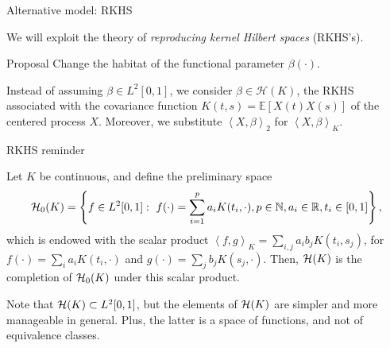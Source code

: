 \documentclass[10pt, english, professionalfonts]{beamer}
\newcommand\maroon[1]{\color{mLightBrown}#1\color{mDarkTeal}}
\newcommand{\N}{\mathbb{N}}
\newcommand{\R}{\mathbb{R}}
\newcommand{\Hcal}{\ensuremath\mathcal{H}}
\newcommand\dotprod[2]{\left\langle #1, #2 \right\rangle}
\begin{document}
\begin{frame}{Alternative model: RKHS}

We will exploit the theory of \textit{reproducing kernel Hilbert spaces} (RKHS's).

\vspace{1em}
\begin{alertblock}{Proposal}
  Change the habitat of the functional parameter \(\beta(\cdot)\).
\end{alertblock}

\vspace{1em}
  Instead of assuming \(\beta \in L^2[0, 1]\), we consider \maroon{\(\beta \in \mathcal H(K)\)}, the RKHS associated with the covariance function \(K(t, s)=\mathbb E[X(t)X(s)]\) of the centered process \(X\). Moreover, we substitute \(\dotprod{X}{\beta}_2\) for \maroon{\(\dotprod{X}{\beta}_K\)}.
\end{frame}


\begin{frame}{RKHS reminder}
  \begin{definition}
    Let \(K\) be continuous, and define the preliminary space
    \[
    \Hcal_0(K) = \left\{ f \in L^2[0,1]: \ f(\cdot) = \sum_{i=1}^p a_i K(t_i, \cdot),  p \in \N,  a_i \in \R,  t_i \in [0, 1] \right\},
    \]
    which is endowed with the scalar product \(\dotprod{f}{g}_K = \sum_{i, j} a_i b_j K(t_i, s_j)\), for \(f(\cdot)=\sum_i a_i K(t_i, \cdot) \) and \(g(\cdot)=\sum_j b_j K(s_j, \cdot)\). Then, \(\Hcal(K)\) is the completion of \(\Hcal_0(K)\) under this scalar product.
  \end{definition}

  \vspace{1em}

  Note that \(\Hcal(K)\subset L^2[0, 1]\), but the elements of \(\Hcal(K)\) are simpler and more manageable in general. Plus, the latter is a space of \maroon{functions}, and not of equivalence classes.
\end{frame}
\end{document}
